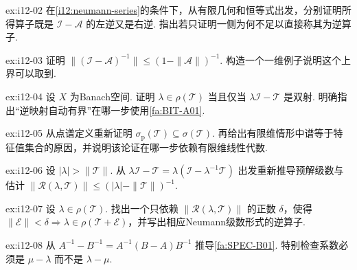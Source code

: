 \begin{FAExercise}[Neumann左右逆]{ex:i12-02}
在\autoref{i12:neumann-series}的条件下，从有限几何和恒等式出发，分别证明所得算子既是 \(\displaystyle \mathcal I-\mathcal A\) 的左逆又是右逆. 指出若只证明一侧为何不足以直接称其为逆算子.
\end{FAExercise}

\begin{FAExercise}[逆算子范数估计]{ex:i12-03}
证明 \(\displaystyle \|(\mathcal I-\mathcal A)^{-1}\|\leqslant(1-\|\mathcal A\|)^{-1}\). 构造一个一维例子说明这个上界可以取到.
\end{FAExercise}

\begin{FAExercise}[预解定义与有界逆定理的等价]{ex:i12-04}
设 \(\displaystyle X\) 为Banach空间. 证明 \(\displaystyle \lambda\in\rho(\mathcal T)\) 当且仅当 \(\displaystyle \lambda\mathcal I-\mathcal T\) 是双射. 明确指出“逆映射自动有界”在哪一步使用\autoref{fa:BIT-A01}.
\end{FAExercise}

\begin{FAExercise}[点谱是谱的子集]{ex:i12-05}
从点谱定义重新证明 \(\displaystyle \sigma_{\mathrm p}(\mathcal T)\subseteq\sigma(\mathcal T)\). 再给出有限维情形中谱等于特征值集合的原因，并说明该论证在哪一步依赖有限维线性代数.
\end{FAExercise}

\begin{FAExercise}[大参数预解]{ex:i12-06}
设 \(\displaystyle |\lambda|>\|\mathcal T\|\). 从 \(\displaystyle \lambda\mathcal I-\mathcal T=\lambda(\mathcal I-\lambda^{-1}\mathcal T)\) 出发重新推导预解级数与估计 \(\displaystyle \|\mathcal R(\lambda,\mathcal T)\|\leqslant(|\lambda|-\|\mathcal T\|)^{-1}\).
\end{FAExercise}

\begin{FAExercise}[扰动可逆性]{ex:i12-07}
设 \(\displaystyle \lambda\in\rho(\mathcal T)\). 找出一个只依赖 \(\displaystyle \|\mathcal R(\lambda,\mathcal T)\|\) 的正数 \(\displaystyle \delta\)，使得 \(\displaystyle \|\mathcal E\|<\delta\Rightarrow\lambda\in\rho(\mathcal T+\mathcal E)\)，并写出相应Neumann级数形式的逆算子.
\end{FAExercise}

\begin{FAExercise}[预解恒等式的符号]{ex:i12-08}
从 \(\displaystyle A^{-1}-B^{-1}=A^{-1}(B-A)B^{-1}\) 推导\autoref{fa:SPEC-B01}. 特别检查系数必须是 \(\displaystyle \mu-\lambda\) 而不是 \(\displaystyle \lambda-\mu\).
\end{FAExercise}

